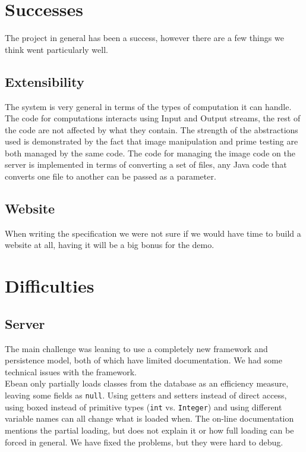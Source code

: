 \documentclass[a4paper,10pt]{article}
\begin{document}
\section{Successes}

The project in general has been a success, however there are a few things we think went particularly well.

\subsection{Extensibility}

The system is very general in terms of the types of computation it can handle.
The code for computations interacts using Input and Output streams, the rest of the code are not affected by what they contain.
The strength of the abstractions used is demonstrated by the fact that image manipulation and prime testing are both managed by the same code.
The code for managing the image code on the server is implemented in terms of converting a set of files, any Java code that converts one file to another can be passed as a parameter.

\subsection{Website}

When writing the specification we were not sure if we would have time to build a website at all, having it will be a big bonus for the demo.




\section{Difficulties}

\subsection{Server}

The main challenge was leaning to use a completely new framework and persistence model, both of which have limited documentation.
We had some technical issues with the framework.\\

Ebean only partially loads classes from the database as an efficiency measure, leaving some fields as \texttt{null}.
Using getters and setters instead of direct access, using boxed instead of primitive types (\texttt{int} vs. \texttt{Integer}) and using different variable names
can all change what is loaded when. The on-line documentation mentions the partial loading, but does not explain it or how full loading can be forced in general.
We have fixed the problems, but they were hard to debug.\\
\end{document}
